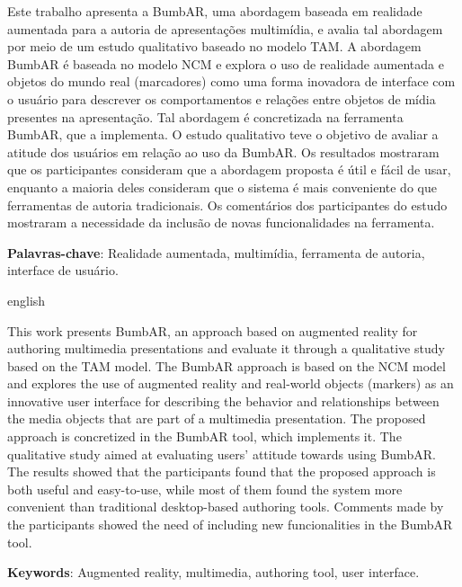 \documentclass[
	12pt,				%
	openright,			%
	oneside,			%
	a4paper,			%
	ho do papel. 
	english,			%
	french,				%
	spanish,			%
	brazil,				%
	]{abntex2}
\begin{document}


\begin{resumo}

Este trabalho apresenta a BumbAR, uma abordagem baseada em realidade aumentada para a autoria de apresentações multimídia, e avalia tal abordagem por meio de um estudo qualitativo baseado no modelo TAM. A abordagem BumbAR é baseada no modelo NCM e explora o uso de realidade aumentada e objetos do mundo real (marcadores) como uma forma inovadora de interface com o usuário para descrever os comportamentos e relações entre objetos de mídia presentes na apresentação. Tal abordagem é concretizada na ferramenta BumbAR, que a implementa. O estudo qualitativo teve o objetivo de avaliar a atitude dos usuários em relação ao uso da BumbAR. Os resultados mostraram que os participantes consideram que a abordagem proposta é útil e fácil de usar, enquanto a maioria deles consideram que o sistema é mais conveniente do que ferramentas de autoria tradicionais. Os comentários dos participantes do estudo mostraram a necessidade da inclusão de novas funcionalidades na ferramenta. 

\noindent
\textbf{Palavras-chave}: Realidade aumentada, multimídia, ferramenta de autoria, interface de usuário.

\end{resumo}

% 
\begin{resumo}[Abstract]
\begin{otherlanguage*}{english}

This work presents BumbAR, an approach based on augmented reality for authoring multimedia presentations and evaluate it through a qualitative study based on the TAM model. The BumbAR approach is based on the NCM model and explores the use of augmented reality and real-world objects (markers) as an innovative user interface for describing the behavior and relationships between the media objects that are part of a multimedia presentation. The proposed approach is concretized in the BumbAR tool, which implements it. The qualitative study aimed at evaluating users' attitude towards using BumbAR. The results showed that the participants found that the proposed approach is both useful and easy-to-use, while most of them found the system more convenient than traditional desktop-based authoring tools. Comments made by the participants showed the need of including new funcionalities in the BumbAR tool.

\noindent
\textbf{Keywords}: Augmented reality, multimedia, authoring tool, user interface.
\end{otherlanguage*}
\end{resumo}
\cleardoublepage
\listoffigures*
\cleardoublepage
\end{document}
